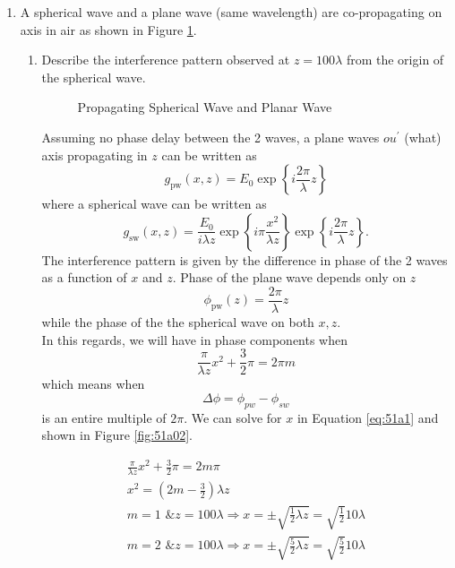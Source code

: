 \documentclass[main.tex]{subfiles}
\begin{document}
\begin{enumerate}
\item{A spherical wave and a plane wave (same wavelength) are co-propagating on axis in air as shown in Figure \ref{fig:51}.}


\begin{enumerate}
\item{Describe the interference pattern observed at $z=100\lambda$ from the origin of the spherical wave.}

\begin{figure}
\centering{}
\caption{Propagating Spherical Wave and Planar Wave}
\label{fig:51}
\end{figure}

Assuming  no phase delay between the 2 waves, a plane waves $ou^{\prime}$ (what) axis propagating in $z$ can be written as 
$$g_{\mathrm{pw}}(x,z)=E_0 \exp \left \{ i \frac{2 \pi}{\lambda} z \right \}$$
where a spherical wave can be written as
$$g_{\mathrm{sw}}(x,z)= \frac{E_0}{i \lambda z} \exp \left \{ i \pi \frac{x^2}{\lambda z}  \right \} \exp \left \{ i \frac{2 \pi}{\lambda} z \right \}.$$
The interference pattern is given by the difference in phase of the 2 waves as a function of $x$ and $z$. Phase of the plane wave depends only on $z$
$$\phi_{\mathrm{pw}}(z)=\frac{2\pi}{\lambda}z$$
while the phase of the the spherical wave on both $x,z$.\\

In this regards, we will have in phase components when
$$\frac{\pi}{\lambda z}x^2 + \frac{3}{2}\pi = 2\pi m$$
which means when 
$$\Delta \phi = \phi_{pw} - \phi_{sw}$$
is an entire multiple of $2\pi$. We can solve for $x$ in Equation \ref{eq:51a1} and shown in Figure \ref{fig:51a02}.

\begin{equation}\label{eq:51a1}
\begin{array}{l}
\frac{\pi}{\lambda z}x^2 + \frac{3}{2}\pi = 2m \pi \\
x^2 = \left( 2m - \frac{3}{2} \right) \lambda z\\
m=1 \text{ \& } z=100\lambda \Rightarrow x = \pm \sqrt{\frac{1}{2}\lambda z} = \sqrt{\frac{1}{2}}10 \lambda\\
m=2 \text{ \& } z=100\lambda \Rightarrow x = \pm \sqrt{\frac{5}{2}\lambda z} = \sqrt{\frac{5}{2}}10 \lambda\\
\end{array}
\end{equation}


\end{enumerate}
\end{enumerate}
\end{document}

